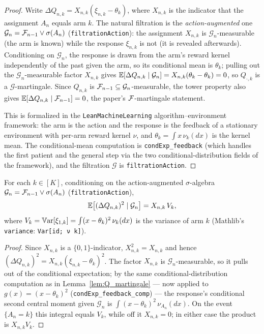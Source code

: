 \begin{proof}\leanok
Write $\Delta Q_{n,k} = X_{n,k}(\xi_{n,k} - \theta_k)$, where $X_{n,k}$ is the
indicator that the assignment $A_n$ equals arm $k$. The natural filtration is the
\emph{action-augmented} one $\mathcal{G}_n = \mathcal{F}_{n-1}\vee\sigma(A_n)$
(\texttt{filtrationAction}): the assignment $X_{n,k}$ is $\mathcal{G}_n$-measurable
(the arm is known) while the response $\xi_{n,k}$ is not (it is revealed afterwards).
Conditioning on $\mathcal{G}_n$, the response is drawn from the arm's reward kernel
independently of the past given the arm, so its conditional mean is $\theta_k$;
pulling out the $\mathcal{G}_n$-measurable factor $X_{n,k}$ gives
$\mathbb{E}[\Delta Q_{n,k}\mid\mathcal{G}_n] = X_{n,k}(\theta_k-\theta_k)=0$, so $Q_{\cdot,k}$ is
a $\mathcal{G}$-martingale. Since $Q_{n,k}$ is $\mathcal{F}_{n-1}\subseteq\mathcal{G}_n$-measurable,
the tower property also gives $\mathbb{E}[\Delta Q_{n,k}\mid\mathcal{F}_{n-1}] = 0$, the paper's
$\mathcal{F}$-martingale statement.

This is formalized in the \texttt{LeanMachineLearning} algorithm--environment
framework: the arm is the action and the response is the feedback of a stationary
environment with per-arm reward kernel $\nu$, and $\theta_k = \int x\,\nu_k(dx)$ is
the kernel mean. The conditional-mean computation is \texttt{condExp\_feedback}
(which handles the first patient and the general step via the two conditional-distribution
fields of the framework), and the filtration $\mathcal{G}$ is \texttt{filtrationAction}.
\end{proof}

\begin{lemma}\label{lem:Q_cond_second_moment}
\leanok
{}
For each $k \in [K]$, conditioning on the action-augmented $\sigma$-algebra
$\mathcal{G}_n = \mathcal{F}_{n-1}\vee\sigma(A_n)$ (\texttt{filtrationAction}),
\[
  \mathbb{E}\big[(\Delta Q_{n,k})^2 \mid \mathcal{G}_n\big] = X_{n,k}\, V_k,
\]
where $V_k = \mathbb{V}\mathrm{ar}[\xi_{1,k}] = \int (x-\theta_k)^2\,\nu_k(dx)$ is the variance of arm $k$
(Mathlib's \texttt{variance}: \texttt{Var[id; ν k]}).
\end{lemma}

\begin{proof}\leanok
Since $X_{n,k}$ is a $\{0,1\}$-indicator, $X_{n,k}^2 = X_{n,k}$ and hence
$(\Delta Q_{n,k})^2 = X_{n,k}(\xi_{n,k}-\theta_k)^2$. The factor $X_{n,k}$ is
$\mathcal{G}_n$-measurable, so it pulls out of the conditional expectation; by the same
conditional-distribution computation as in Lemma~\ref{lem:Q_martingale} --- now applied to
$g(x) = (x-\theta_k)^2$ (\texttt{condExp\_feedback\_comp}) --- the response's conditional
second central moment given $\mathcal{G}_n$ is $\int (x-\theta_k)^2\,\nu_{A_n}(dx)$. On the
event $\{A_n = k\}$ this integral equals $V_k$, while off it $X_{n,k}=0$; in either case
the product is $X_{n,k} V_k$.
\end{proof}

